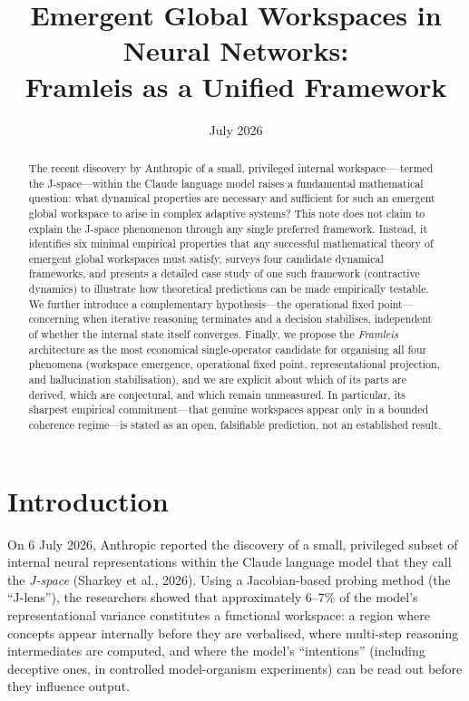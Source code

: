 \documentclass[11pt,a4paper]{article}
\title{\textbf{Emergent Global Workspaces in Neural Networks:}\\
\textbf{Framleis as a Unified Framework}}
\author{}
\date{July 2026}
\theoremstyle{definition}
\begin{document}
\maketitle

\begin{abstract}
The recent discovery by Anthropic of a small, privileged internal workspace—
termed the J-space—within the Claude language model raises a fundamental
mathematical question: what dynamical properties are necessary and sufficient
for such an emergent global workspace to arise in complex adaptive systems?
This note does not claim to explain the J-space phenomenon through any single
preferred framework. Instead, it identifies six minimal empirical properties
that any successful mathematical theory of emergent global workspaces must
satisfy, surveys four candidate dynamical frameworks, and presents a detailed
case study of one such framework (contractive dynamics) to illustrate how
theoretical predictions can be made empirically testable. We further introduce
a complementary hypothesis—the operational fixed point—concerning when
iterative reasoning terminates and a decision stabilises, independent of
whether the internal state itself converges. Finally, we propose the
\emph{Framleis} architecture as the most economical single-operator candidate for
organising all four phenomena (workspace emergence, operational fixed point,
representational projection, and hallucination stabilisation), and we are explicit
about which of its parts are derived, which are conjectural, and which remain
unmeasured. In particular, its sharpest empirical commitment---that genuine
workspaces appear only in a bounded coherence regime---is stated as an open,
falsifiable prediction, not an established result.
\end{abstract}

\section{Introduction}
\label{sec:intro}

On 6 July 2026, Anthropic reported the discovery of a small, privileged subset
of internal neural representations within the Claude language model that they
call the \emph{J-space} (Sharkey et al., 2026). Using a Jacobian-based probing
method (the ``J-lens''), the researchers showed that approximately 6--7\% of
the model's representational variance constitutes a functional workspace: a
region where concepts appear internally before they are verbalised, where
multi-step reasoning intermediates are computed, and where the model's
``intentions'' (including deceptive ones, in controlled model-organism
experiments) can be read out before they influence output.
\end{document}
